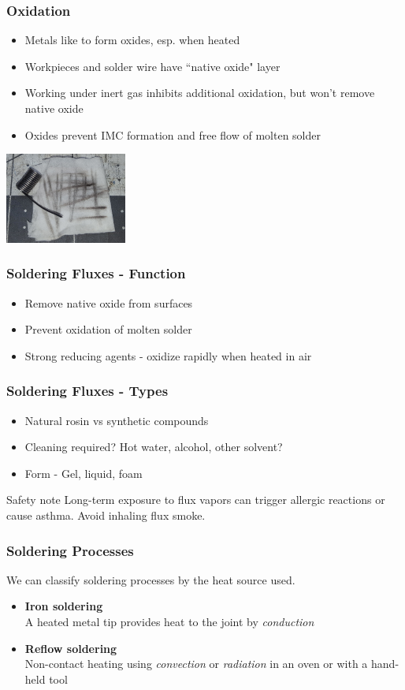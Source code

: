 \documentclass{beamer}
\begin{document}
\begin{frame}
\frametitle{Oxidation}
\begin{itemize}
\item Metals like to form oxides, esp. when heated
\item Workpieces and solder wire have ``native oxide" layer
\item Working under inert gas inhibits additional oxidation, but won't remove native oxide
\item Oxides prevent IMC formation and free flow of molten solder
\end{itemize}
\begin{center}
\includegraphics[width=4cm,keepaspectratio]{solder-oxidation.jpg}
\end{center}
\end{frame}

\begin{frame}
\frametitle{Soldering Fluxes - Function}
\begin{itemize}
\item Remove native oxide from surfaces
\item Prevent oxidation of molten solder
\item Strong reducing agents - oxidize rapidly when heated in air
\end{itemize}
\end{frame}

\begin{frame}
\frametitle{Soldering Fluxes - Types}
\begin{itemize}
\item Natural rosin vs synthetic compounds
\item Cleaning required? Hot water, alcohol, other solvent?
\item Form - Gel, liquid, foam
\end{itemize}
\begin{alertblock}{Safety note}
Long-term exposure to flux vapors can trigger allergic reactions or cause asthma. Avoid inhaling flux smoke.
\end{alertblock}
\end{frame}

\begin{frame}
\frametitle{Soldering Processes}
We can classify soldering processes by the heat source used.
\begin{itemize}
\item \textbf{Iron soldering} \\
A heated metal tip provides heat to the joint by \emph{conduction}
\item \textbf{Reflow soldering} \\
Non-contact heating using \emph{convection} or \emph{radiation} in an oven or with a hand-held tool
\end{itemize}
\end{frame}
\end{document}
